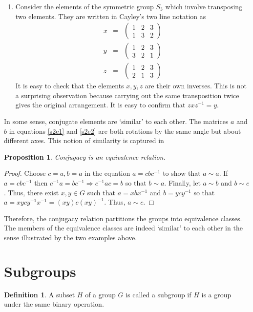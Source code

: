 \documentclass{article}
\theoremstyle{plain}
\numberwithin{thm}{section}
\theoremstyle{plain}
\newtheorem{prop}{Proposition}
\numberwithin{prop}{section}
\theoremstyle{definition}
\newtheorem{defn}{Definition}
\numberwithin{defn}{section}
\theoremstyle{remark}
\numberwithin{equation}{section}
\begin{document}
\begin{enumerate}
\item Consider the elements of the symmetric group $S_3$ which involve 
transposing two elements. They are written in Cayley's two line notation as
\begin{eqnarray}
x &=& \begin{pmatrix}1 & 2 & 3 \\ 1 & 3 & 2 \end{pmatrix} \label{s2e5} \\
y &=& \begin{pmatrix}1 & 2 & 3 \\ 3 & 2 & 1 \end{pmatrix} \label{s2e6} \\
z &=& \begin{pmatrix}1 & 2 & 3 \\ 2 & 1 & 3 \end{pmatrix} \label{s2e7}
\end{eqnarray}
It is easy to check that the elements $x, y, z$ are their own inverses. This
is not a surprising observation because carrying out the same transposition
twice gives the original arrangement. It is easy to confirm that $zxz^{-1} = y$.
\end{enumerate}

In some sense, conjugate elements are `similar' to each other. The matrices
$a$ and $b$ in equations \eqref{s2e1} and \eqref{s2e2} are both rotations 
by the same angle but about different axes. This notion of similarity is 
captured in
\begin{prop}\label{s2p1}
Conjugacy is an equivalence relation.
\end{prop}
\begin{proof}
Choose $c = a, b = a$ in the equation $a = cbc^{-1}$ to show that $a \sim a$.
If $a = cbc^{-1}$ then $c^{-1}a = bc^{-1} \Rightarrow c^{-1}ac = b$ so that
$b \sim a$. Finally, let $a \sim b$ and $b \sim c$. Thus, there exist $x, y
\in G$ such that $a = xbx^{-1}$ and $b = ycy^{-1}$ so that $a = xycy^{-1}x^{-1}
= (xy)c(xy)^{-1}$. Thus, $a \sim c$.
\end{proof}

Therefore, the conjugacy relation partitions the groups into equivalence 
classes. The members of the equivalence classes are indeed `similar' to each
other in the sense illustrated by the two examples above.

\section{Subgroups}\label{s3}
\begin{defn}\label{s3d1}
A subset $H$ of a group $G$ is called a subgroup if $H$ is a group under
the same binary operation.
\end{defn}
\end{document}
